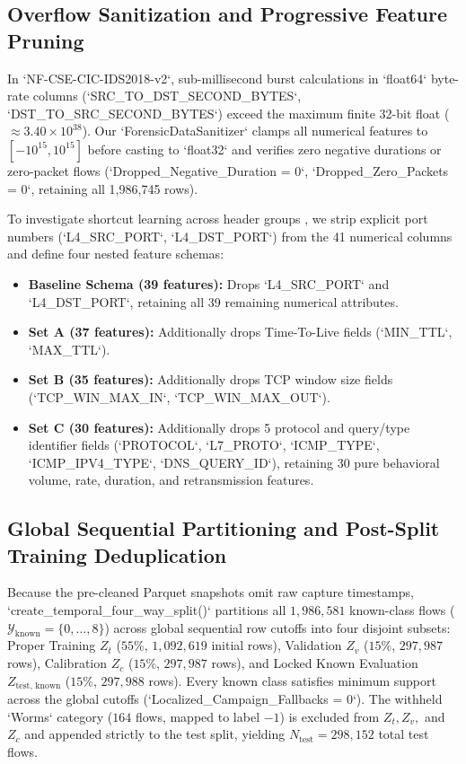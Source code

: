 ﻿\documentclass[conference]{IEEEtran}
\begin{document}
\subsection{Overflow Sanitization and Progressive Feature Pruning}
In `NF-CSE-CIC-IDS2018-v2`, sub-millisecond burst calculations in `float64` byte-rate columns (`SRC_TO_DST_SECOND_BYTES`, `DST_TO_SRC_SECOND_BYTES`) exceed the maximum finite 32-bit float ($\approx 3.40 \times 10^{38}$). Our `ForensicDataSanitizer` clamps all numerical features to $[-10^{15}, 10^{15}]$ before casting to `float32` and verifies zero negative durations or zero-packet flows (`Dropped_Negative_Duration = 0`, `Dropped_Zero_Packets = 0`, retaining all 1,986,745 rows).

To investigate shortcut learning across header groups \cite{b1,b6}, we strip explicit port numbers (`L4_SRC_PORT`, `L4_DST_PORT`) from the 41 numerical columns and define four nested feature schemas:
\begin{itemize}
    \item \textbf{Baseline Schema (39 features):} Drops `L4_SRC_PORT` and `L4_DST_PORT`, retaining all 39 remaining numerical attributes.
    \item \textbf{Set A (37 features):} Additionally drops Time-To-Live fields (`MIN_TTL`, `MAX_TTL`).
    \item \textbf{Set B (35 features):} Additionally drops TCP window size fields (`TCP_WIN_MAX_IN`, `TCP_WIN_MAX_OUT`).
    \item \textbf{Set C (30 features):} Additionally drops 5 protocol and query/type identifier fields (`PROTOCOL`, `L7_PROTO`, `ICMP_TYPE`, `ICMP_IPV4_TYPE`, `DNS_QUERY_ID`), retaining 30 pure behavioral volume, rate, duration, and retransmission features.
\end{itemize}

\subsection{Global Sequential Partitioning and Post-Split Training Deduplication}
Because the pre-cleaned Parquet snapshots omit raw capture timestamps, `create_temporal_four_way_split()` partitions all $1,986,581$ known-class flows ($\mathcal{Y}_{\text{known}} = \{0, \dots, 8\}$) across global sequential row cutoffs into four disjoint subsets: Proper Training $Z_t$ ($55\%$, $1,092,619$ initial rows), Validation $Z_v$ ($15\%$, $297,987$ rows), Calibration $Z_c$ ($15\%$, $297,987$ rows), and Locked Known Evaluation $Z_{\text{test, known}}$ ($15\%$, $297,988$ rows). Every known class satisfies minimum support across the global cutoffs (`Localized_Campaign_Fallbacks = 0`). The withheld `Worms` category ($164$ flows, mapped to label $-1$) is excluded from $Z_t, Z_v,$ and $Z_c$ and appended strictly to the test split, yielding $N_{\text{test}} = 298,152$ total test flows.
\end{document}
